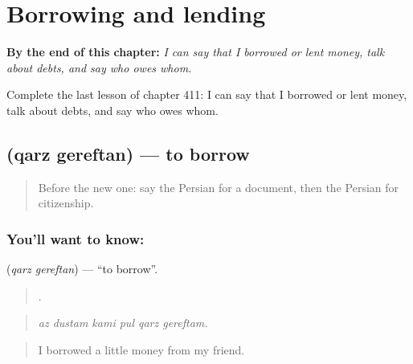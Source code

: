 
\chapter{Borrowing and lending}
\label{ch:fa-borrowing-and-lending}

\begin{chapteropening}
\textbf{By the end of this chapter:} \emph{I can say that I borrowed or lent money, talk about debts, and say who owes whom.}

Complete the last lesson of chapter 411: I can say that I borrowed or lent money, talk about debts, and say who owes whom.
\end{chapteropening}

\section[\texorpdfstring{\fa{قرض} \fa{گرفتن} (qarz gereftan)}{قرض گرفتن (qarz gereftan)}]{  (qarz gereftan) — to borrow}

\label{lesson:FA-C411-qarz-gereftan}



\begin{quote}
Before the new one: say the Persian for a document, then the Persian for citizenship.
\end{quote}

\subsection*{You'll want to know:  }
\textbf{ } (\emph{qarz gereftan}) — \textquotedblleft{}to borrow\textquotedblright{}.

\begin{quote}
     .
\end{quote}

\begin{quote}
\emph{az dustam kami pul qarz gereftam.}
\end{quote}

\begin{quote}
I borrowed a little money from my friend.
\end{quote}


